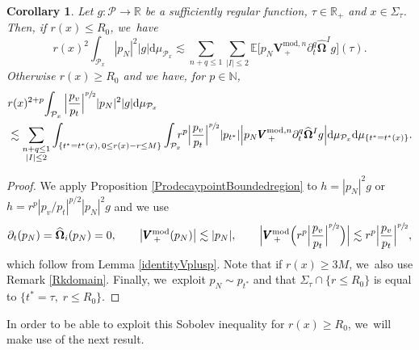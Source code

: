 \documentclass[JEP,XML,SOM,Unicode,published]{cedram}
\theoremstyle{plain}
\newtheorem{corollary}[proposition]{Corollary}
\theoremstyle{definition}
\newcommand\R{{\mathbb{R}}}
\newcommand\dr{{\mathrm{d}}}
\begin{document}
\begin{corollary}\label{Cordecaypoint}
Let $ g :\mathcal{P} \to \R$ be a sufficiently regular function, $\tau \in \R_+$ and $x \in \Sigma_\tau$. Then, if $r(x) \leq R_0$, we~have
\[
r(x)^2 \int_{\mathcal{P}_x} |p_N|^2 |g| \dr \mu_{\mathcal{P}_x} \lesssim \sum_{n+q \leq 1} \sum_{|I| \leq 2} \mathbb{E} \bigl[p_N \pmb{V}_{\, +}^{ \mathrm{mod},n} \partial_t^q \widehat{\mathbf{\Omega}}^I g \bigr] (\tau).
\]
Otherwise $r(x) \geq R_0$ and we have, for $p \in \mathbb{N}$,
\begin{align*}
& r(x)^{2+p} \! \int_{\mathcal{P}_x} \Big|\frac{p_v}{p_t}\Big|^{\sfrac{p}{2}} |p_N|^2 |g| \dr \mu_{\mathcal{P}_x} \\
	& \lesssim \sum_{\substack{n+q \leq 1 \\ |I| \leq 2}} \int_{\{ t^*=t^*(x), \, 0\leq r(x)-r \leq M \}} \int_{\mathcal{P}_x} \hspace*{-2mm}r^p\Big|\frac{p_v}{p_t}\Big|^{\sfrac{p}{2}} |p_{t^*}| \Big| p_N \pmb{V}_{\, +}^{ \mathrm{mod},n} \partial_t^q \widehat{\mathbf{\Omega}}^I g \Big| \dr \mu_{\mathcal{P}_x} \dr \mu_{\{ t^*=t^*(x)\} }.
\end{align*}
\end{corollary}
\begin{proof}
We apply Proposition \ref{ProdecaypointBoundedregion} to $h=|p_N|^2 g$ or $h=r^p|p_v/p_t|^{p/2}|p_N|^2 g$ and we use
\[ \partial_t(p_N)= \widehat{\mathbf{\Omega}}_i(p_N)=0, \qquad \big|\pmb{V}_{\, +}^{ \mathrm{mod}} (p_N) \big| \lesssim |p_N|, \qquad \Bigl |\pmb{V}_{\, +}^{ \mathrm{mod}} \Bigl(r^p\Big|\frac{p_v}{p_t}\Big|^{\sfrac{p}{2}} \Bigr) \Bigr| \lesssim r^p \Big|\frac{p_v}{p_t}\Big|^{\sfrac{p}{2}},
\]
which follow from Lemma \ref{identityVplusp}. Note that if $r(x) \geq 3M$, we~also use Remark \ref{Rkdomain}. Finally, we~exploit $p_N \sim p_{t^*}$ and that $\Sigma_\tau \cap \{ r \leq R_0 \}$ is equal to $\{ t^* = \tau, \; r \leq R_0 \}$.
\end{proof}

In order to be able to exploit this Sobolev inequality for $r(x) \geq R_0$, we~will make use of the next result.
\end{document}
